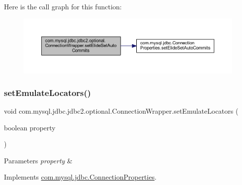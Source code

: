 Here is the call graph for this function\+:
\nopagebreak
\begin{figure}[H]
\begin{center}
\leavevmode
\includegraphics[width=350pt]{classcom_1_1mysql_1_1jdbc_1_1jdbc2_1_1optional_1_1_connection_wrapper_ae265f34efd113d6df170b5354eb960f0_cgraph}
\end{center}
\end{figure}
\mbox{\label{classcom_1_1mysql_1_1jdbc_1_1jdbc2_1_1optional_1_1_connection_wrapper_aa54e4168297c0975cb337fd18c989eac}} 
\subsubsection{\texorpdfstring{set\+Emulate\+Locators()}{setEmulateLocators()}}
{\footnotesize\ttfamily void com.\+mysql.\+jdbc.\+jdbc2.\+optional.\+Connection\+Wrapper.\+set\+Emulate\+Locators (\begin{DoxyParamCaption}\item[{boolean}]{property }\end{DoxyParamCaption})}


\begin{DoxyParams}{Parameters}
{\em property} & \\
\hline
\end{DoxyParams}


Implements \mbox{\hyperlink{interfacecom_1_1mysql_1_1jdbc_1_1_connection_properties_a3cbd4f864707e036d8013706d632a807}{com.\+mysql.\+jdbc.\+Connection\+Properties}}.

